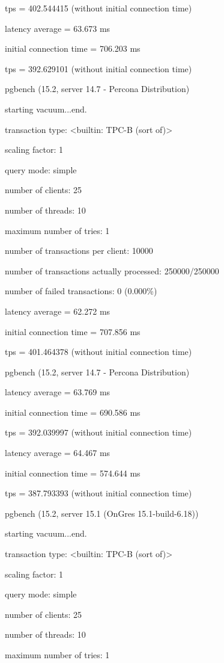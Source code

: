 tps = 402.544415 (without initial connection time)

latency average = 63.673 ms

initial connection time = 706.203 ms

tps = 392.629101 (without initial connection time)


pgbench (15.2, server 14.7 - Percona Distribution)

starting vacuum...end.

transaction type: <builtin: TPC-B (sort of)>

scaling factor: 1

query mode: simple

number of clients: 25

number of threads: 10

maximum number of tries: 1

number of transactions per client: 10000

number of transactions actually processed: 250000/250000

number of failed transactions: 0 (0.000\%)

latency average = 62.272 ms

initial connection time = 707.856 ms

tps = 401.464378 (without initial connection time)

pgbench (15.2, server 14.7 - Percona Distribution)

latency average = 63.769 ms

initial connection time = 690.586 ms

tps = 392.039997 (without initial connection time)

latency average = 64.467 ms

initial connection time = 574.644 ms

tps = 387.793393 (without initial connection time)


pgbench (15.2, server 15.1 (OnGres 15.1-build-6.18))

starting vacuum...end.

transaction type: <builtin: TPC-B (sort of)>

scaling factor: 1

query mode: simple

number of clients: 25

number of threads: 10

maximum number of tries: 1

